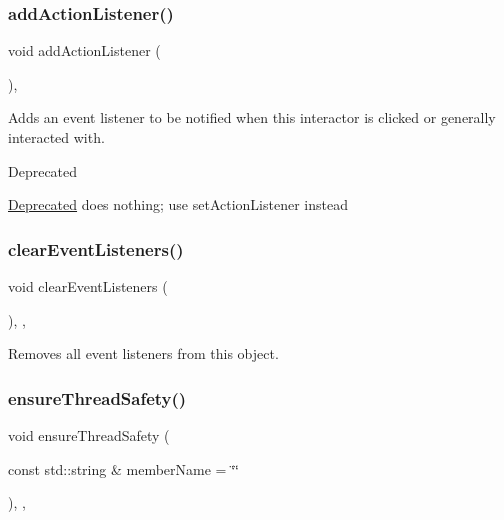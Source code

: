 \subsubsection{\texorpdfstring{add\+Action\+Listener()}{addActionListener()}}
{\footnotesize\ttfamily void add\+Action\+Listener (\begin{DoxyParamCaption}{ }\end{DoxyParamCaption})\hspace{0.3cm}{\ttfamily [virtual]}, {\ttfamily [inherited]}}



Adds an event listener to be notified when this interactor is clicked or generally interacted with. 

\begin{DoxyRefDesc}{Deprecated}
\item[\mbox{\hyperlink{deprecated__deprecated000006}{Deprecated}}]does nothing; use set\+Action\+Listener instead \end{DoxyRefDesc}
\mbox{\label{classsgl_1_1GObservable_a80cfa040459ff53594adbd6a51ec8f43}} 
\subsubsection{\texorpdfstring{clear\+Event\+Listeners()}{clearEventListeners()}}
{\footnotesize\ttfamily void clear\+Event\+Listeners (\begin{DoxyParamCaption}{ }\end{DoxyParamCaption})\hspace{0.3cm}{\ttfamily [protected]}, {\ttfamily [virtual]}, {\ttfamily [inherited]}}



Removes all event listeners from this object. 

\mbox{\label{classsgl_1_1GObservable_a284f31528c0520f8e545c03ac9eeac74}} 
\subsubsection{\texorpdfstring{ensure\+Thread\+Safety()}{ensureThreadSafety()}}
{\footnotesize\ttfamily void ensure\+Thread\+Safety (\begin{DoxyParamCaption}\item[{const std\+::string \&}]{member\+Name = {\ttfamily \char`\"{}\char`\"{}} }\end{DoxyParamCaption})\hspace{0.3cm}{\ttfamily [protected]}, {\ttfamily [virtual]}, {\ttfamily [inherited]}}



